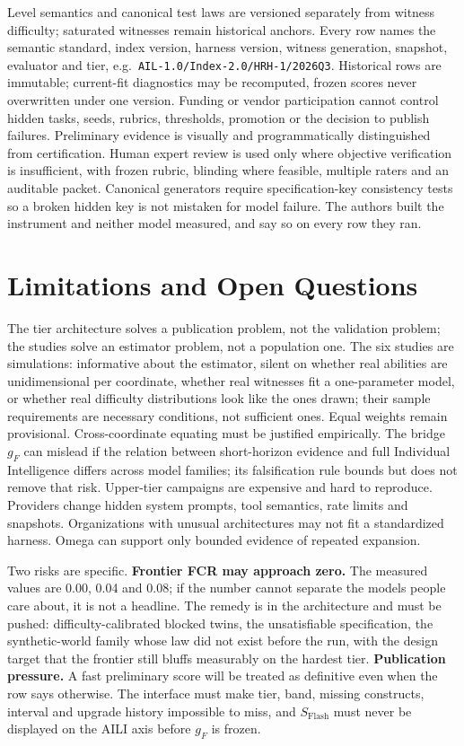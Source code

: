 Level semantics and canonical test laws are versioned separately from witness difficulty; saturated witnesses remain historical anchors. Every row names the semantic standard, index version, harness version, witness generation, snapshot, evaluator and tier, e.g.\ \texttt{AIL-1.0/Index-2.0/HRH-1/2026Q3}. Historical rows are immutable; current-fit diagnostics may be recomputed, frozen scores never overwritten under one version. Funding or vendor participation cannot control hidden tasks, seeds, rubrics, thresholds, promotion or the decision to publish failures. Preliminary evidence is visually and programmatically distinguished from certification. Human expert review is used only where objective verification is insufficient, with frozen rubric, blinding where feasible, multiple raters and an auditable packet. Canonical generators require specification-key consistency tests so a broken hidden key is not mistaken for model failure. The authors built the instrument and neither model measured, and say so on every row they ran.

\section{Limitations and Open Questions}\label{sec:limits}

The tier architecture solves a publication problem, not the validation problem; the studies solve an estimator problem, not a population one. The six studies are simulations: informative about the estimator, silent on whether real abilities are unidimensional per coordinate, whether real witnesses fit a one-parameter model, or whether real difficulty distributions look like the ones drawn; their sample requirements are necessary conditions, not sufficient ones. Equal weights remain provisional. Cross-coordinate equating must be justified empirically. The bridge $g_F$ can mislead if the relation between short-horizon evidence and full Individual Intelligence differs across model families; its falsification rule bounds but does not remove that risk. Upper-tier campaigns are expensive and hard to reproduce. Providers change hidden system prompts, tool semantics, rate limits and snapshots. Organizations with unusual architectures may not fit a standardized harness. Omega can support only bounded evidence of repeated expansion.

Two risks are specific. \textbf{Frontier FCR may approach zero.} The measured values are 0.00, 0.04 and 0.08; if the number cannot separate the models people care about, it is not a headline. The remedy is in the architecture and must be pushed: difficulty-calibrated blocked twins, the unsatisfiable specification, the synthetic-world family whose law did not exist before the run, with the design target that the frontier still bluffs measurably on the hardest tier. \textbf{Publication pressure.} A fast preliminary score will be treated as definitive even when the row says otherwise. The interface must make tier, band, missing constructs, interval and upgrade history impossible to miss, and $S_{\mathrm{Flash}}$ must never be displayed on the AILI axis before $g_F$ is frozen.

